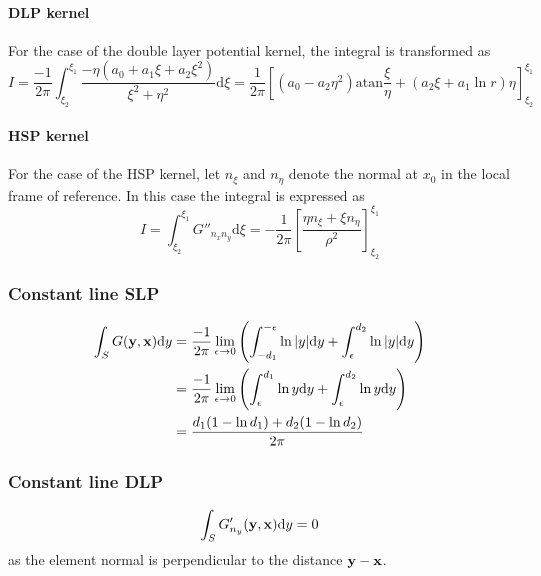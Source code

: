 \documentclass[a4paper,11pt]{article}
\newcommand{\td}{\mathrm{d}}
\newcommand{\atan}{\mathrm{atan}}
\begin{document}
\paragraph{DLP kernel}

For the case of the double layer potential kernel, the integral is transformed as
%
\begin{equation}
I = \frac{-1}{2\pi} \int_{\xi_2}^{\xi_1} \frac{-\eta \left(a_0 + a_1 \xi + a_2 \xi^2 \right)}{\xi^2+\eta^2}\td \xi
= \frac{1}{2\pi} \left[
\left( a_0 - a_2 \eta^2\right) \atan \frac{\xi}{\eta} + \left(a_2 \xi + a_1 \ln r\right) \eta
\right]_{\xi_2}^{\xi_1}
\end{equation}

\paragraph{HSP kernel}

For the case of the HSP kernel, let $n_{\xi}$ and $n_{\eta}$ denote the normal at $x_0$ in the local frame of reference. In this case the integral is expressed as
%
\begin{equation}
I
= \int_{\xi_2}^{\xi_1} G''_{n_x n_y} \td \xi
= -\frac{1}{2\pi} \left[ \frac{ \eta n_{\xi} + \xi n_{\eta} }{\rho^2} \right]_{\xi_2}^{\xi_1}
\end{equation}

\subsubsection{Constant line SLP}

\begin{align}
\int_{S} G({\bf y}, {\bf x}) \td y
& = \frac{-1}{2\pi}\lim_{\epsilon \to 0}
\left( \int_{-d_1}^{-\epsilon} \ln |y| \td y + \int_{\epsilon}^{d_2}  \ln |y| \td y \right) \nonumber \\
& = \frac{-1}{2\pi}\lim_{\epsilon \to 0}
\left( \int_{\epsilon}^{d_1} \ln y \td y + \int_{\epsilon}^{d_2}  \ln y \td y \right) \nonumber \\
&=
\frac{d_1(1-\ln d_1) + d_2(1-\ln d_2)}{2\pi}
\end{align}

\subsubsection{Constant line DLP}

\begin{equation}
\int_{S} G'_{n_y}({\bf y}, {\bf x}) \td y = 0
\end{equation}
%
as the element normal is perpendicular to the distance ${\bf y}-{\bf x}$.
\end{document}
